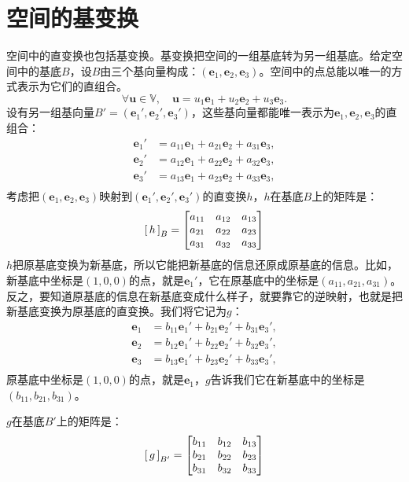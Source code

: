 \documentclass[12pt,UTF8]{ctexbook}
\begin{document}
\section{空间的基变换}
空间中的直变换也包括基变换。基变换把空间的一组基底转为另一组基底。给定空间中的基底$B$，设$B$由三个基向量构成：$(\mathbf{e}_1,\mathbf{e}_2,\mathbf{e}_3)$。空间中的点总能以唯一的方式表示为它们的直组合。
$$\forall \mathbf{u} \in \mathbb{V}, \quad \mathbf{u} = u_1\mathbf{e}_1 + u_2\mathbf{e}_2 + u_3\mathbf{e}_3.  $$
设有另一组基向量$B' = (\mathbf{e}_1',\mathbf{e}_2',\mathbf{e}_3')$，这些基向量都能唯一表示为$\mathbf{e}_1,\mathbf{e}_2,\mathbf{e}_3$的直组合：
\begin{align*}
    \mathbf{e}_1' &= a_{11}\mathbf{e}_1 + a_{21}\mathbf{e}_2 + a_{31}\mathbf{e}_3, \\
    \mathbf{e}_2' &= a_{12}\mathbf{e}_1 + a_{22}\mathbf{e}_2 + a_{32}\mathbf{e}_3, \\
    \mathbf{e}_3' &= a_{13}\mathbf{e}_1 + a_{23}\mathbf{e}_2 + a_{33}\mathbf{e}_3, \\
\end{align*}
考虑把$(\mathbf{e}_1,\mathbf{e}_2,\mathbf{e}_3)$映射到$(\mathbf{e}_1',\mathbf{e}_2',\mathbf{e}_3')$的直变换$h$，$h$在基底$B$上的矩阵是：
$$
\bmat{h}[B] = 
\begin{bmatrix}
    a_{11} & a_{12} & a_{13} \\ a_{21} & a_{22} & a_{23} \\ a_{31} & a_{32} & a_{33}
\end{bmatrix}
$$
$h$把原基底变换为新基底，所以它能把新基底的信息还原成原基底的信息。比如，新基底中坐标是$(1,0,0)$的点，就是$\mathbf{e}_1'$，它在原基底中的坐标是$(a_{11},a_{21},a_{31})$。反之，要知道原基底的信息在新基底变成什么样子，就要靠它的逆映射，也就是把新基底变换为原基底的直变换。我们将它记为$g$：
\begin{align*}
    \mathbf{e}_1 &= b_{11}\mathbf{e}_1' + b_{21}\mathbf{e}_2' + b_{31}\mathbf{e}_3', \\
    \mathbf{e}_2 &= b_{12}\mathbf{e}_1' + b_{22}\mathbf{e}_2' + b_{32}\mathbf{e}_3', \\
    \mathbf{e}_3 &= b_{13}\mathbf{e}_1' + b_{23}\mathbf{e}_2' + b_{33}\mathbf{e}_3', \\
\end{align*}
原基底中坐标是$(1,0,0)$的点，就是$\mathbf{e}_1$，$g$告诉我们它在新基底中的坐标是$(b_{11},b_{21},b_{31})$。

$g$在基底$B'$上的矩阵是：
$$
\bmat{g}[B'] = 
\begin{bmatrix}
    b_{11} & b_{12} & b_{13} \\ b_{21} & b_{22} & b_{23} \\ b_{31} & b_{32} & b_{33}
\end{bmatrix}
$$
\end{document}
